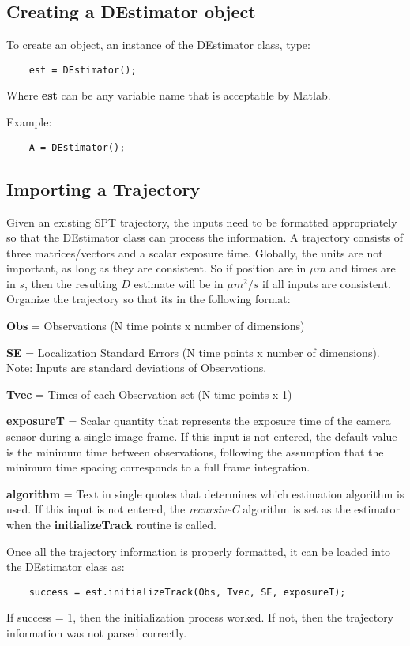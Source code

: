 \documentclass{article}
\begin{document}
\subsection{Creating a DEstimator object}
To create an object, an instance of the DEstimator class, type:
\begin{verbatim}
    est = DEstimator();
\end{verbatim}
Where \textbf{est} can be any variable name that is acceptable by Matlab.

Example:
\begin{verbatim}
    A = DEstimator();
\end{verbatim}

\subsection{Importing a Trajectory}
\label{sec:ImpTraj}
Given an existing SPT trajectory, the inputs need to be formatted appropriately so that the DEstimator class can process the information.  A trajectory consists of three matrices/vectors and a scalar exposure time.  Globally, the units are not important, as long as they are consistent.  So if position are in $\mu m$ and times are in $s$, then the resulting $D$ estimate will be in $\mu m^2 /s$ if all inputs are consistent.  Organize the trajectory so that its in the following format:

\textbf{Obs} = Observations (N time points x number of dimensions)

\textbf{SE} = Localization Standard Errors (N time points x number of dimensions).  Note: Inputs are standard deviations of Observations.

\textbf{Tvec} = Times of each Observation set (N time points x 1)

\textbf{exposureT} = Scalar quantity that represents the exposure time of the camera sensor during a single image frame.  If this input is not entered, the default value is the minimum time between observations, following the assumption that the minimum time spacing corresponds to a full frame integration.

\textbf{algorithm} = Text in single quotes that determines which estimation algorithm is used.  If this input is not entered, the \textit{recursiveC} algorithm is set as the estimator when the \textbf{initializeTrack} routine is called.

Once all the trajectory information is properly formatted, it can be loaded into the DEstimator class as:
\begin{verbatim}
    success = est.initializeTrack(Obs, Tvec, SE, exposureT);
\end{verbatim}
If success = 1, then the initialization process worked.  If not, then the trajectory information was not parsed correctly.
\end{document}
